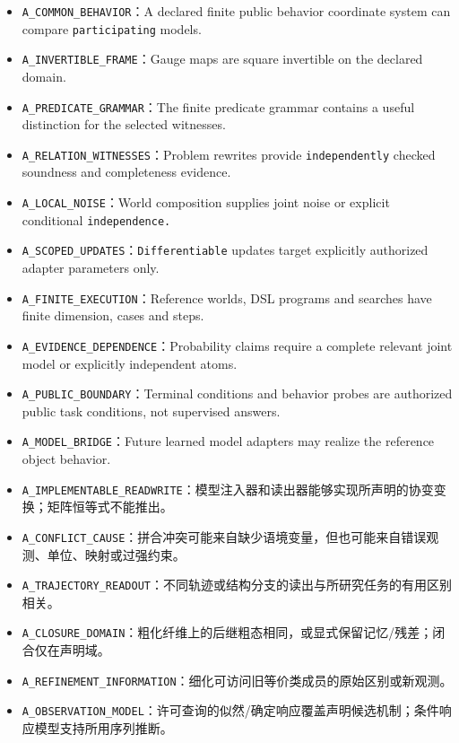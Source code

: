 \documentclass[
  10pt,
]{article}
\providecommand{\tightlist}{%
  \setlength{\itemsep}{0pt}\setlength{\parskip}{0pt}}
\begin{document}
\begin{itemize}
\tightlist
\item
  \nolinkurl{A_COMMON_BEHAVIOR}：A declared finite public behavior
  coordinate system can compare \nolinkurl{participating} models.
\item
  \nolinkurl{A_INVERTIBLE_FRAME}：Gauge maps are square invertible on
  the declared domain.
\item
  \nolinkurl{A_PREDICATE_GRAMMAR}：The finite predicate grammar contains
  a useful distinction for the selected witnesses.
\item
  \nolinkurl{A_RELATION_WITNESSES}：Problem rewrites provide
  \nolinkurl{independently} checked soundness and completeness evidence.
\item
  \nolinkurl{A_LOCAL_NOISE}：World composition supplies joint noise or
  explicit conditional \nolinkurl{independence.}
\item
  \nolinkurl{A_SCOPED_UPDATES}：\nolinkurl{Differentiable} updates
  target explicitly authorized adapter parameters only.
\item
  \nolinkurl{A_FINITE_EXECUTION}：Reference worlds, DSL programs and
  searches have finite dimension, cases and steps.
\item
  \nolinkurl{A_EVIDENCE_DEPENDENCE}：Probability claims require a
  complete relevant joint model or explicitly independent atoms.
\item
  \nolinkurl{A_PUBLIC_BOUNDARY}：Terminal conditions and behavior probes
  are authorized public task conditions, not supervised answers.
\item
  \nolinkurl{A_MODEL_BRIDGE}：Future learned model adapters may realize
  the reference object behavior.
\item
  \nolinkurl{A_IMPLEMENTABLE_READWRITE}：模型注入器和读出器能够实现所声明的协变变换；矩阵恒等式不能推出。
\item
  \nolinkurl{A_CONFLICT_CAUSE}：拼合冲突可能来自缺少语境变量，但也可能来自错误观测、单位、映射或过强约束。
\item
  \nolinkurl{A_TRAJECTORY_READOUT}：不同轨迹或结构分支的读出与所研究任务的有用区别相关。
\item
  \nolinkurl{A_CLOSURE_DOMAIN}：粗化纤维上的后继粗态相同，或显式保留记忆/残差；闭合仅在声明域。
\item
  \nolinkurl{A_REFINEMENT_INFORMATION}：细化可访问旧等价类成员的原始区别或新观测。
\item
  \nolinkurl{A_OBSERVATION_MODEL}：许可查询的似然/确定响应覆盖声明候选机制；条件响应模型支持所用序列推断。

\end{itemize}
\end{document}
